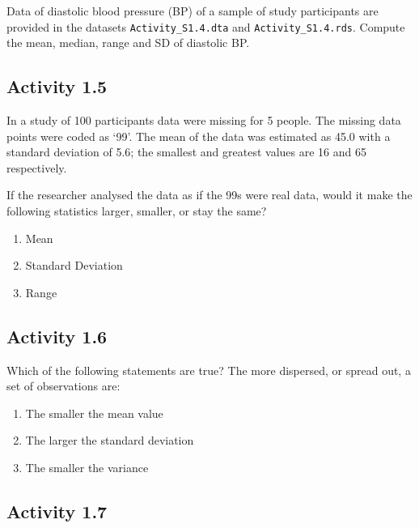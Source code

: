 \documentclass[
  a4paper,
]{memoir}
\providecommand{\tightlist}{%
  \setlength{\itemsep}{0pt}\setlength{\parskip}{0pt}}\usepackage{longtable,booktabs,array}
\begin{document}
Data of diastolic blood pressure (BP) of a sample of study participants
are provided in the datasets \texttt{Activity\_S1.4.dta} and
\texttt{Activity\_S1.4.rds}. Compute the mean, median, range and SD of
diastolic BP.

\hypertarget{activity-1.5}{%
\subsection*{Activity 1.5}\label{activity-1.5}}

In a study of 100 participants data were missing for 5 people. The
missing data points were coded as `99'. The mean of the data was
estimated as 45.0 with a standard deviation of 5.6; the smallest and
greatest values are 16 and 65 respectively.

If the researcher analysed the data as if the 99s were real data, would
it make the following statistics larger, smaller, or stay the same?

\begin{enumerate}
\def\labelenumi{\alph{enumi})}
\tightlist
\item
  Mean
\item
  Standard Deviation
\item
  Range
\end{enumerate}

\hypertarget{activity-1.6}{%
\subsection*{Activity 1.6}\label{activity-1.6}}

Which of the following statements are true? The more dispersed, or
spread out, a set of observations are:

\begin{enumerate}
\def\labelenumi{\alph{enumi})}
\tightlist
\item
  The smaller the mean value
\item
  The larger the standard deviation
\item
  The smaller the variance
\end{enumerate}

\hypertarget{activity-1.7}{%
\subsection*{Activity 1.7}\label{activity-1.7}}
\end{document}

